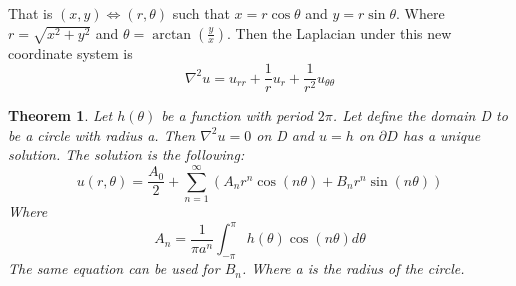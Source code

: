 \documentclass{article}
\newtheorem{theorem}{Theorem}[section]
\begin{document}
That is $(x,y) \iff (r, \theta)$ such that $x = r\cos\theta$ and $y = r\sin\theta$. Where $r = \sqrt{x^2 + y^2}$ and $\theta = \arctan(\frac{y}{x})$. Then the Laplacian under this new coordinate system is 
\begin{equation}
    \nabla^2u = u_{rr} + \frac{1}{r}u_r + \frac{1}{r^2}u_{\theta \theta}
\end{equation}

\begin{theorem}
    Let $h(\theta)$ be a function with period $2\pi$. Let define the domain D to be a circle with radius a. Then $\nabla^2u = 0$ on D and $u = h$ on $\partial D$ has a unique solution. The solution is the following:
    \begin{equation}
        u(r, \theta) = \frac{A_0}{2} + \sum_{n=1}^{\infty}(A_n r^n\cos(n\theta) + B_n r^n \sin(n\theta))
    \end{equation}
    Where 
    \begin{equation}
        A_n = \frac{1}{\pi a^n}\int_{-\pi}^{\pi}h(\theta)\cos(n\theta) d\theta
    \end{equation}
    The same equation can be used for $B_n$. Where a is the radius of the circle. 
\end{theorem}
\end{document}

